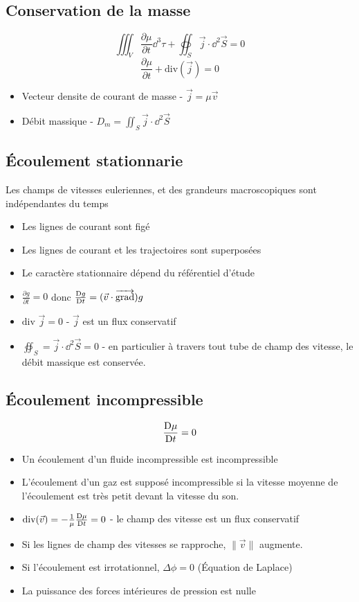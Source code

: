 \documentclass[openany]{book}
\begin{document}
\subsection{Conservation de la masse}

\[ \iiint_V \frac{\partial \mu}{\partial t} \dd^3 \tau + \oiint_S \vec{j} \cdot \dd^2 \vec{S} = 0 \]
\[ \frac{\partial \mu}{\partial t} + \text{div}(\vec{j}) = 0 \]

\begin{itemize}
    \item Vecteur densite de courant de masse - $\vec{j} = \mu \vec{v}$
    \item Débit massique - $D_m = \iint_S \vec{j} \cdot \dd^2\vec{S}$
\end{itemize}

\subsection{Écoulement stationnarie}

Les champs de vitesses euleriennes, et des grandeurs macroscopiques sont indépendantes du temps

\begin{itemize}
    \item Les lignes de courant sont figé
    \item Les lignes de courant et les trajectoires sont superposées
    \item Le caractère stationnaire dépend du référentiel d'étude
    \item $\frac{\partial g}{\partial t} = 0$ donc $\frac{\text{D} g}{\text{D} t} = (\vec{v}\cdot\overrightarrow{{\text{grad}}}) g$
    \item $\text{div } \vec{j} = 0$ - $\vec{j}$ est un flux conservatif
    \item $\oiint_S = \vec{j} \cdot \dd^2 \vec{S} = 0$ - en particulier à travers tout tube de champ des vitesse, le débit massique est conservée. 
\end{itemize}

\subsection{Écoulement incompressible}

\[ \frac{\text{D} \mu}{\text{D} t} = 0 \]

\begin{itemize}
    \item Un écoulement d'un fluide incompressible est incompressible
    \item L'écoulement d'un gaz est supposé incompressible si la vitesse moyenne de l'écoulement est très petit devant la vitesse du son. 
    \item $\text{div}(\vec{v}) = -\frac{1}{\mu} \frac{\text{D} \mu}{\text{D} t} = 0$ - le champ des vitesse est un flux conservatif
    \item Si les lignes de champ des vitesses se rapproche, $\|\vec{v}\|$ augmente. 
    \item Si l'écoulement est irrotationnel, $\Delta \phi = 0$ (Équation de Laplace)
    \item La puissance des forces intérieures de pression est nulle
\end{itemize}
\end{document}
